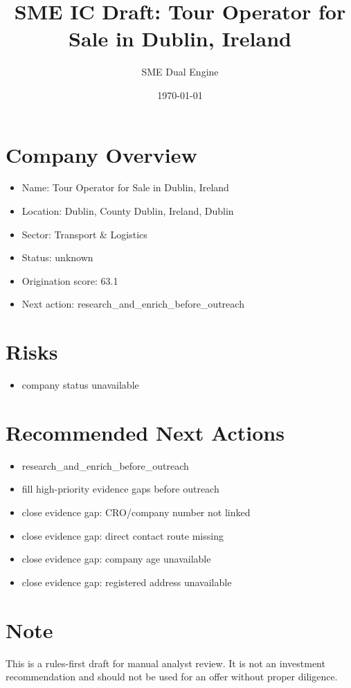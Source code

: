 \documentclass[11pt,a4paper]{article}
\title{SME IC Draft: Tour Operator for Sale in Dublin, Ireland}
\author{SME Dual Engine}
\date{\today}
\begin{document}
\maketitle
\section*{Company Overview}
\begin{itemize}[leftmargin=1.4em]
\item Name: Tour Operator for Sale in Dublin, Ireland
\item Location: Dublin, County Dublin, Ireland, Dublin
\item Sector: Transport \& Logistics
\item Status: unknown
\item Origination score: 63.1
\item Next action: research\_and\_enrich\_before\_outreach
\end{itemize}
\section*{Risks}
\begin{itemize}[leftmargin=1.4em]
\item company status unavailable
\end{itemize}
\section*{Recommended Next Actions}
\begin{itemize}[leftmargin=1.4em]
\item research\_and\_enrich\_before\_outreach
\item fill high-priority evidence gaps before outreach
\item close evidence gap: CRO/company number not linked
\item close evidence gap: direct contact route missing
\item close evidence gap: company age unavailable
\item close evidence gap: registered address unavailable
\end{itemize}
\section*{Note}
This is a rules-first draft for manual analyst review. It is not an investment
recommendation and should not be used for an offer without proper diligence.
\end{document}
